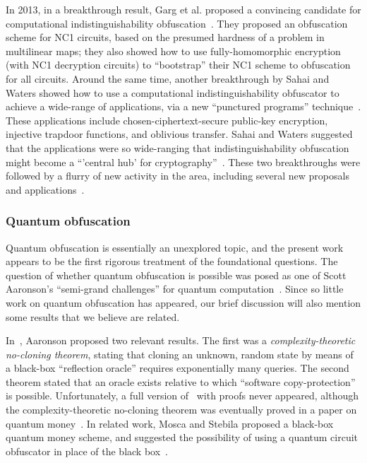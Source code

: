 \documentclass[envcountsame]{llncs}
\numberwithin{equation}{section}
\begin{document}
In 2013, in a breakthrough result, Garg et al. proposed a convincing candidate for computational indistinguishability obfuscation~\cite{GGHRSW13}. They proposed an obfuscation scheme for NC1 circuits, based on the presumed hardness of a problem in multilinear maps; they also showed how to use fully-homomorphic encryption (with NC1 decryption circuits) to ``bootstrap'' their NC1 scheme to obfuscation for all circuits. Around the same time, another breakthrough by Sahai and Waters showed how to use a computational indistinguishability obfuscator to achieve a wide-range of applications, via a new ``punctured programs'' technique~\cite{SW14}. These applications include chosen-ciphertext-secure public-key encryption, injective trapdoor functions, and oblivious transfer. Sahai and Waters suggested that the applications were so wide-ranging that indistinguishability obfuscation might become a ``'central hub' for cryptography''~\cite{SW14}. These two breakthroughs were followed by a flurry of new activity in the area, including several new proposals and applications~\cite{BGKPS14, BCCGKPR14, BZ14, BR14, GGHW14, HSW14}.

\subsubsection{Quantum obfuscation} 

Quantum obfuscation is essentially an unexplored topic, and the present work appears to be the first rigorous treatment of the foundational questions. The question of whether quantum obfuscation is possible was posed as one of Scott Aaronson's ``semi-grand challenges'' for quantum computation~\cite{Aar05}. Since so little work on quantum obfuscation has appeared, our brief discussion will also mention some results that we believe are related. 

In~\cite{Aar09}, Aaronson proposed two relevant results. The first was a \emph{complexity-theoretic no-cloning theorem}, stating that cloning an unknown, random state by means of a black-box ``reflection oracle'' requires exponentially many queries. The second theorem stated that an oracle exists relative to which ``software copy-protection'' is possible. Unfortunately, a full version of~\cite{Aar09} with proofs never appeared, although the complexity-theoretic no-cloning theorem was eventually proved in a paper on quantum money~\cite{AC12}. In related work, Mosca and Stebila proposed a black-box quantum money scheme, and suggested the possibility of using a quantum circuit obfuscator in place of the black box~\cite{MS10}.
\end{document}
